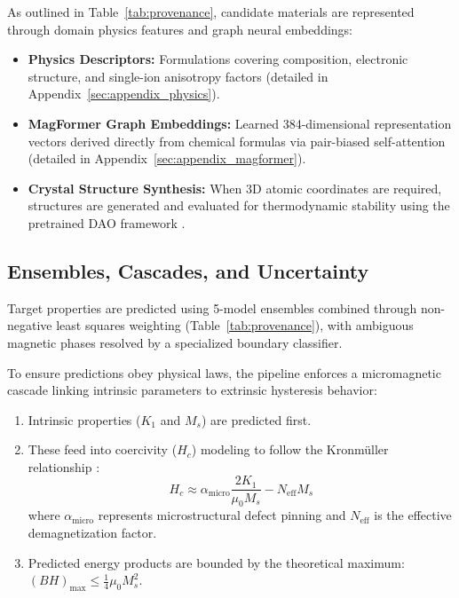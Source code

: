 \documentclass[11pt,a4paper]{article}
\begin{document}
As outlined in Table~\ref{tab:provenance}, candidate materials are represented through domain physics features and graph neural embeddings:
\begin{itemize}[leftmargin=1.5em]
    \item \textbf{Physics Descriptors:} Formulations covering composition, electronic structure, and single-ion anisotropy factors (detailed in Appendix~\ref{sec:appendix_physics}).
    \item \textbf{MagFormer Graph Embeddings:} Learned 384-dimensional representation vectors derived directly from chemical formulas via pair-biased self-attention (detailed in Appendix~\ref{sec:appendix_magformer}).
    \item \textbf{Crystal Structure Synthesis:} When 3D atomic coordinates are required, structures are generated and evaluated for thermodynamic stability using the pretrained DAO framework \cite{dao2026}.
\end{itemize}

\subsection{Ensembles, Cascades, and Uncertainty}
\label{sec:ensembles_and_cascades}

Target properties are predicted using 5-model ensembles combined through non-negative least squares weighting (Table~\ref{tab:provenance}), with ambiguous magnetic phases resolved by a specialized boundary classifier.

To ensure predictions obey physical laws, the pipeline enforces a micromagnetic cascade linking intrinsic parameters to extrinsic hysteresis behavior:
\begin{enumerate}[leftmargin=1.5em]
    \item Intrinsic properties ($K_1$ and $M_s$) are predicted first.
    \item These feed into coercivity ($H_c$) modeling to follow the Kronmüller relationship \cite{kronmuller2003}:
    \begin{equation}
        H_c \approx \alpha_{\text{micro}} \frac{2 K_1}{\mu_0 M_s} - N_{\text{eff}} M_s
        \label{eq:kronmuller}
    \end{equation}
    where $\alpha_{\text{micro}}$ represents microstructural defect pinning and $N_{\text{eff}}$ is the effective demagnetization factor.
    \item Predicted energy products are bounded by the theoretical maximum: $(BH)_{\max} \le \frac{1}{4}\mu_0 M_s^2$.
\end{enumerate}
\end{document}
